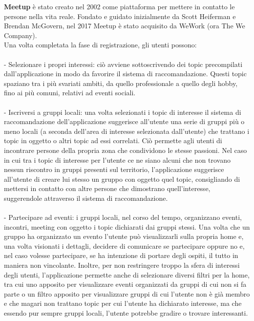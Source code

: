 \documentclass[fleqn,10pt]{SelfArx} %
\begin{document}
{\small %
\textbf{Meetup} è stato creato nel 2002 come piattaforma per mettere in contatto le persone nella vita reale. Fondato e guidato inizialmente da Scott Heiferman e Brendan McGovern, nel 2017 Meetup è stato acquisito da WeWork (ora The We Company). \\
Una volta completata la fase di registrazione, gli utenti possono: \\
\\
- Selezionare i propri interessi: ciò avviene sottoscrivendo dei topic precompilati dall'applicazione in modo da favorire il sistema di raccomandazione. Questi topic spaziano tra i più svariati ambiti, da quello professionale a quello degli hobby, fino ai più comuni, relativi ad eventi sociali. \\
\\
- Iscriversi a gruppi locali: una volta selezionati i topic di interesse il sistema di raccomandazione dell'applicazione suggerisce all'utente una serie di gruppi più o meno locali (a seconda dell'area di interesse selezionata dall'utente) che trattano i topic in oggetto o altri topic ad essi correlati. Ciò permette agli utenti di incontrare persone della propria zona che condividono le stesse passioni. Nel caso in cui tra i topic di interesse per l'utente ce ne siano alcuni che non trovano nessun riscontro in gruppi presenti sul territorio, l'applicazione suggerisce all'utente di creare lui stesso un gruppo con oggetto quel topic, consigliando di mettersi in contatto con altre persone che dimostrano quell'interesse, suggerendole attraverso il sistema di raccomandazione.\\
\\
- Partecipare ad eventi: i gruppi locali, nel corso del tempo, organizzano eventi, incontri, meeting con oggetto i topic dichiarati dai gruppi stessi. Una volta che un gruppo ha organizzato un evento l'utente può visualizzarli sulla propria home e, una volta visionati i dettagli, decidere di comunicare se partecipare oppure no e, nel caso volesse partecipare, se ha intenzione di portare degli ospiti, il tutto in maniera non vincolante. Inoltre, per non restringere troppo la sfera di interessi degli utenti, l'applicazione permette anche di selezionare diversi filtri per la home, tra cui uno apposito per visualizzare eventi organizzati da gruppi di cui non si fa parte o un filtro apposito per visualizzare gruppi di cui l'utente non è già membro e che magari non trattano topic per cui l'utente ha dichiarato interesse, ma che essendo pur sempre gruppi locali, l'utente potrebbe gradire o trovare interessanti.\\
}
\end{document}

